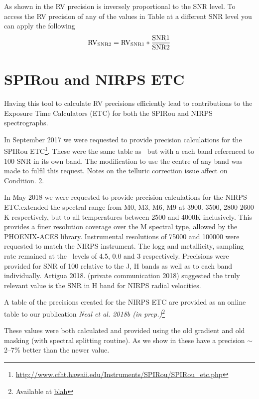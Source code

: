 As shown in the RV precision is inversely proportional to the SNR level. To access the RV precision of any of the values in Table at a different SNR level you can apply the following
\begin{equation}
\rm RV_{SNR2} = RV_{SNR1} * \frac{SNR1}{SNR2}
\end{equation}


\section{SPIRou and NIRPS ETC}
Having this tool to calculate RV precisions efficiently lead to contributions to the Exposure Time Calculators (ETC) for both the SPIRou and NIRPS spectrographs.

In September 2017 we were requested to provide precision calculations for the SPIRou ETC\footnote{\url{http://www.cfht.hawaii.edu/Instruments/SPIRou/SPIRou_etc.php}}. These were the same table as~\citet{figueira_radial_2016} but with a each band referenced to 100 SNR in its own band. The modification to use the centre of any band was made to fulfil this request. Notes on the telluric correction issue affect on Condition. 2.

In May 2018 we were requested to provide precision calculations for the NIRPS ETC.\@This extended the spectral range from M0, M3, M6, M9 at 3900. 3500, 2800 2600 K respectively, but to all temperatures between 2500 and 4000K inclusively. This provides a finer resolution coverage over the M spectral type, allowed by the PHOENIX-ACES library.
Instrumental resolutions of 75000 and 100000 were requested to match the NIRPS instrument.
The logg and metallicity, sampling rate remained at the~\citet{figueira_radial_2016} levels of 4.5, 0.0 and 3 respectively.
Precisions were provided for SNR of 100 relative to the J, H bands as well as to each band individually. Artigua 2018. (private communication 2018) suggested the truly relevant value is the SNR in H band for NIRPS radial velocities.

A table of the precisions created for the NIRPS ETC are provided as an online table to our publication \textit{Neal et al. 2018b (in prep.)}\footnote{Available at \href{blah}{blah}} 


These values were both calculated and provided using the old gradient and old masking (with spectral splitting routine). As we show in \sref{} these have a precision \(\sim\)2--7\% better than the newer value.







